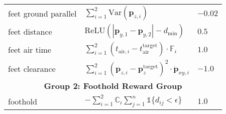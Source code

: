 \begin{table}[h]
\begin{tabular}{lll}
    feet ground parallel & $\sum_{i=1}^2 \text{Var}(\mathbf{p}_{z, i})$ & $-0.02$ \\ [0.2ex]
    feet distance & $\text{ReLU} \left( |\mathbf{p}_{y, 1} - \mathbf{p}_{y, 2}| - d_\text{min} \right)$ & $0.5$ \\ [0.2ex]
    feet air time & $\sum_{i=1}^2 \left( t_{\text{air}, i} - t_\text{air}^\text{target} \right) \cdot \mathbb{F}_i$ & $1.0$ \\ [0.2ex]
    feet clearance & $\sum_{i=1}^2 \left(\mathbf{p}_{z, i} - \mathbf{p}_{z}^\text{target} \right)^2 \cdot \dot{\mathbf{p}}_{xy, i}$ & $-1.0$ \\ [0.2ex]
    
    \midrule[0.5pt] 
    \multicolumn{3}{c}{\textbf{Group 2: Foothold Reward Group}} \\ [0.2ex]
    foothold & $-\sum_{i=1}^2 \mathbb{C}_i \sum_{j=1}^n \mathds{1} \{ d_{ij} < \epsilon \}$ & $1.0$ \\ [0.2ex]
    \bottomrule[1.0pt]
    \end{tabular}
    \label{tab:reward}
\end{table}